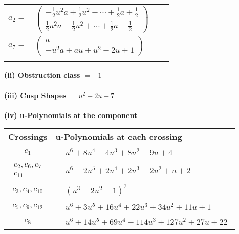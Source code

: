 \documentclass[1p]{elsarticle_modified}
\theoremstyle{definition}
\begin{document}
\begin{tabular}{m{7pt} m{180pt} m{7pt} m{180pt} }
\flushright $a_{2}=$&$\begin{pmatrix}-\frac{1}{2} u^2 a+\frac{1}{2} u^2+\cdots+\frac{1}{2} a+\frac{1}{2}\\\frac{1}{2} u^2 a-\frac{1}{2} u^2+\cdots+\frac{1}{2} a-\frac{1}{2}\end{pmatrix}$ \\
\flushright $a_{7}=$&$\begin{pmatrix}a\\- u^2 a+a u+u^2-2 u+1\end{pmatrix}$\\&\end{tabular}
\flushleft \textbf{(ii) Obstruction class $= -1$}\\~\\
\flushleft \textbf{(iii) Cusp Shapes $= u^2-2 u+7$}\\~\\
\newpage\renewcommand{\arraystretch}{1}
\flushleft \textbf{(iv) u-Polynomials at the component}\newline \\
\begin{tabular}{m{50pt}|m{274pt}}
Crossings & \hspace{64pt}u-Polynomials at each crossing \\
\hline $$\begin{aligned}c_{1}\end{aligned}$$&$\begin{aligned}
&u^6+8 u^4-4 u^3+8 u^2-9 u+4
\end{aligned}$\\
\hline $$\begin{aligned}c_{2},c_{6},c_{7}\\c_{11}\end{aligned}$$&$\begin{aligned}
&u^6-2 u^5+2 u^4+2 u^3-2 u^2+u+2
\end{aligned}$\\
\hline $$\begin{aligned}c_{3},c_{4},c_{10}\end{aligned}$$&$\begin{aligned}
&(u^3-2 u^2-1)^2
\end{aligned}$\\
\hline $$\begin{aligned}c_{5},c_{9},c_{12}\end{aligned}$$&$\begin{aligned}
&u^6+3 u^5+16 u^4+22 u^3+34 u^2+11 u+1
\end{aligned}$\\
\hline $$\begin{aligned}c_{8}\end{aligned}$$&$\begin{aligned}
&u^6+14 u^5+69 u^4+114 u^3+127 u^2+27 u+22
\end{aligned}$\\
\hline
\end{tabular}\\~\\
\end{document}
